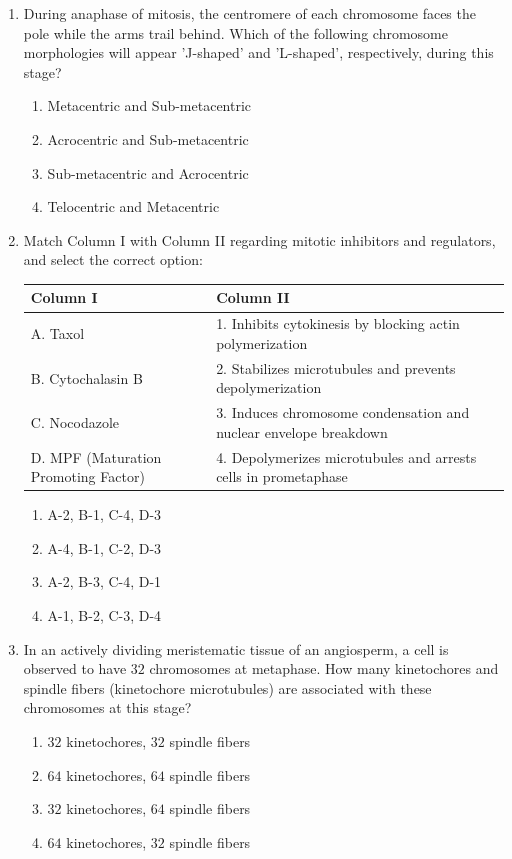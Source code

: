 \documentclass[11pt,a4paper]{article}
\begin{document}
\begin{enumerate}[label=\textbf{\arabic*.}, leftmargin=*]
\item During anaphase of mitosis, the centromere of each chromosome faces the pole while the arms trail behind. Which of the following chromosome morphologies will appear 'J-shaped' and 'L-shaped', respectively, during this stage?
\begin{enumerate}[label=(\alph*)]
    \item Metacentric and Sub-metacentric
    \item Acrocentric and Sub-metacentric
    \item Sub-metacentric and Acrocentric
    \item Telocentric and Metacentric
\end{enumerate}

\item Match Column I with Column II regarding mitotic inhibitors and regulators, and select the correct option:
\begin{center}
\begin{tabular}{|l|l|}
\hline
\textbf{Column I} & \textbf{Column II} \\
\hline
A. Taxol & 1. Inhibits cytokinesis by blocking actin polymerization \\
B. Cytochalasin B & 2. Stabilizes microtubules and prevents depolymerization \\
C. Nocodazole & 3. Induces chromosome condensation and nuclear envelope breakdown \\
D. MPF (Maturation Promoting Factor) & 4. Depolymerizes microtubules and arrests cells in prometaphase \\
\hline
\end{tabular}
\end{center}
\begin{enumerate}[label=(\alph*)]
    \item A-2, B-1, C-4, D-3
    \item A-4, B-1, C-2, D-3
    \item A-2, B-3, C-4, D-1
    \item A-1, B-2, C-3, D-4
\end{enumerate}

\item In an actively dividing meristematic tissue of an angiosperm, a cell is observed to have $32$ chromosomes at metaphase. How many kinetochores and spindle fibers (kinetochore microtubules) are associated with these chromosomes at this stage?
\begin{enumerate}[label=(\alph*)]
    \item $32$ kinetochores, $32$ spindle fibers
    \item $64$ kinetochores, $64$ spindle fibers
    \item $32$ kinetochores, $64$ spindle fibers
    \item $64$ kinetochores, $32$ spindle fibers
\end{enumerate}


\end{enumerate}
\end{document}
